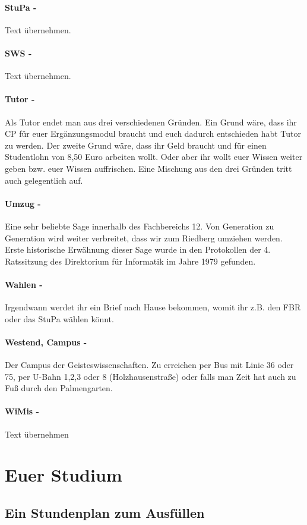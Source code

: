 \documentclass[12pt,a4paper]{article}
\begin{document}
	\paragraph{StuPa -} Text übernehmen.
	\paragraph{SWS -} Text übernehmen.
	\paragraph{Tutor -} Als Tutor endet man aus drei verschiedenen Gründen. Ein Grund wäre, dass ihr CP für euer Ergänzungsmodul braucht und euch dadurch entschieden habt Tutor zu werden. Der zweite Grund wäre, dass ihr Geld braucht und für einen Studentlohn von 8,50 Euro arbeiten wollt. Oder aber ihr wollt euer Wissen weiter geben bzw. euer Wissen auffrischen. Eine Mischung aus den drei Gründen tritt auch gelegentlich auf.
	\paragraph{Umzug -} Eine sehr beliebte Sage innerhalb des Fachbereichs 12. Von Generation zu Generation wird weiter verbreitet, dass wir zum Riedberg umziehen werden. Erste historische Erwähnung dieser Sage wurde in den Protokollen der 4. Ratssitzung des Direktorium für Informatik im Jahre 1979 gefunden.
	\paragraph{Wahlen -} Irgendwann werdet ihr ein Brief nach Hause bekommen, womit ihr z.B. den FBR oder das StuPa wählen könnt.
	\paragraph{Westend, Campus -} Der Campus der Geisteswissenschaften. Zu erreichen per Bus mit Linie 36 oder 75, per U-Bahn 1,2,3 oder 8 (Holzhausenstraße) oder falls man Zeit hat auch zu Fuß durch den Palmengarten.
	\paragraph{WiMis -} Text übernehmen
	\section{Euer Studium}
	\subsection{Ein Stundenplan zum Ausfüllen}
\end{document}
